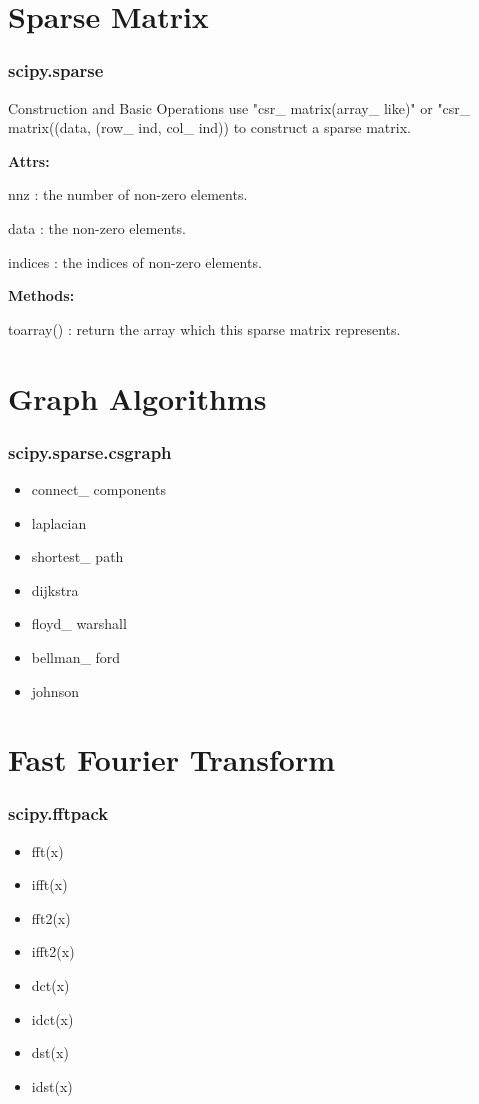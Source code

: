 \documentclass[english, nochinese]{beamer}
\begin{document}
\section{Sparse Matrix}
\begin{frame}
\frametitle{scipy.sparse}
\begin{block}{Construction and Basic Operations}
use "csr\_ matrix(array\_ like)" or "csr\_ matrix((data, (row\_ ind, col\_ ind)) to construct a sparse matrix.

\textbf{Attrs:}

nnz : the number of non-zero elements.

data : the non-zero elements.

indices : the indices of non-zero elements.


\textbf{Methods:}

toarray() : return the array which this sparse matrix represents.



\end{block}
\end{frame}



\section{Graph Algorithms}
\begin{frame}
\frametitle{scipy.sparse.csgraph}
\begin{itemize}
\item connect\_ components
\item laplacian
\item shortest\_ path
\item dijkstra
\item floyd\_ warshall
\item bellman\_ ford
\item johnson

\end{itemize}
\end{frame}
\section{Fast Fourier Transform}
\begin{frame}
\frametitle{scipy.fftpack}
\begin{itemize}
\item fft(x)
\item ifft(x)
\item fft2(x)
\item ifft2(x)
\item dct(x)
\item idct(x)
\item dst(x)
\item idst(x)
\end{itemize}
\end{frame}
\end{document}

